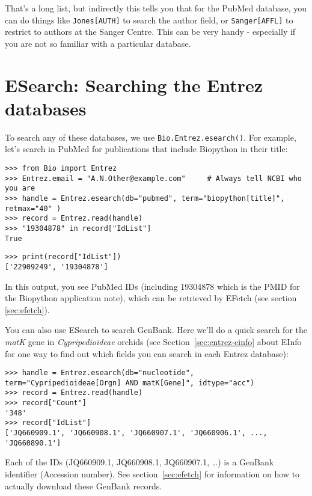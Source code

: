 That's a long list, but indirectly this tells you that for the PubMed
database, you can do things like \texttt{Jones[AUTH]} to search the
author field, or \texttt{Sanger[AFFL]} to restrict to authors at the
Sanger Centre. This can be very handy - especially if you are not so
familiar with a particular database.

\section{ESearch: Searching the Entrez databases}
\label{sec:entrez-esearch}
To search any of these databases, we use \verb+Bio.Entrez.esearch()+. For example, let's search in PubMed for publications that include Biopython in their title:

\begin{verbatim}
>>> from Bio import Entrez
>>> Entrez.email = "A.N.Other@example.com"     # Always tell NCBI who you are
>>> handle = Entrez.esearch(db="pubmed", term="biopython[title]", retmax="40" )
>>> record = Entrez.read(handle)
>>> "19304878" in record["IdList"]
True
\end{verbatim}
\begin{verbatim}
>>> print(record["IdList"])
['22909249', '19304878']
\end{verbatim}
In this output, you see PubMed IDs (including 19304878 which is the PMID for the Biopython application note), which can be retrieved by EFetch (see section \ref{sec:efetch}).

You can also use ESearch to search GenBank. Here we'll do a quick
search for the \emph{matK} gene in \emph{Cypripedioideae} orchids
(see Section~\ref{sec:entrez-einfo} about EInfo for one way to
find out which fields you can search in each Entrez database):

\begin{verbatim}
>>> handle = Entrez.esearch(db="nucleotide", term="Cypripedioideae[Orgn] AND matK[Gene]", idtype="acc")
>>> record = Entrez.read(handle)
>>> record["Count"]
'348'
>>> record["IdList"]
['JQ660909.1', 'JQ660908.1', 'JQ660907.1', 'JQ660906.1', ..., 'JQ660890.1']
\end{verbatim}

\noindent Each of the IDs (JQ660909.1, JQ660908.1, JQ660907.1, \ldots) is a GenBank identifier (Accession number).
See section~\ref{sec:efetch} for information on how to actually download these GenBank records.

